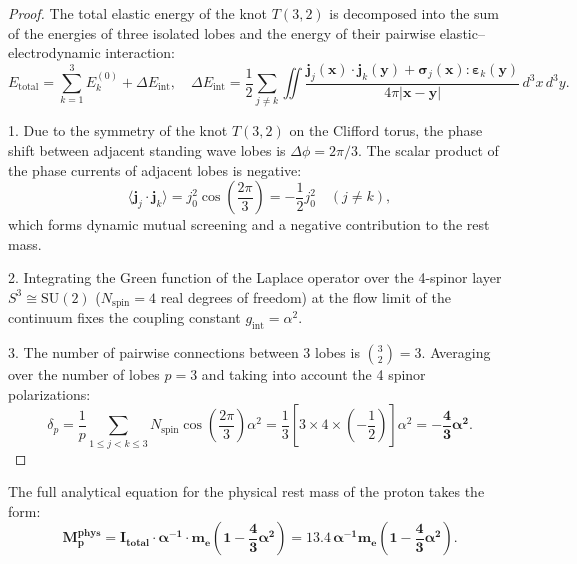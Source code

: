 \documentclass[12pt,a4paper]{article}
\begin{document}
	\begin{proof}
	The total elastic energy of the knot $T(3,2)$ is decomposed into the sum of the energies of three isolated lobes and the energy of their pairwise elastic--electrodynamic interaction:
	\begin{equation}
	E_{\text{total}} = \sum_{k=1}^3 E_k^{(0)} + \Delta E_{\text{int}}, \quad \Delta E_{\text{int}} = \frac{1}{2} \sum_{j \ne k} \iint \frac{\mathbf{j}_j(\mathbf{x}) \cdot \mathbf{j}_k(\mathbf{y}) + \boldsymbol{\sigma}_j(\mathbf{x}) : \boldsymbol{\varepsilon}_k(\mathbf{y})}{4\pi |\mathbf{x} - \mathbf{y}|} \, d^3x \, d^3y.
	\end{equation}
				
	1. Due to the symmetry of the knot $T(3,2)$ on the Clifford torus, the phase shift between adjacent standing wave lobes is $\Delta \phi = 2\pi/3$. The scalar product of the phase currents of adjacent lobes is negative:
	\begin{equation}
	\langle \mathbf{j}_j \cdot \mathbf{j}_k \rangle = j_0^2 \cos\left(\frac{2\pi}{3}\right) = -\frac{1}{2} j_0^2 \quad (j \ne k),
	\end{equation}
	which forms dynamic mutual screening and a negative contribution to the rest mass.
				
	2. Integrating the Green function of the Laplace operator over the 4-spinor layer $S^3 \cong \mathrm{SU}(2)$ ($N_{\text{spin}} = 4$ real degrees of freedom) at the flow limit of the continuum fixes the coupling constant $g_{\text{int}} = \alpha^2$.
				
	3. The number of pairwise connections between 3 lobes is $\binom{3}{2} = 3$. Averaging over the number of lobes $p=3$ and taking into account the 4 spinor polarizations:
	\begin{equation}
	\delta_p = \frac{1}{p} \sum_{1 \le j < k \le 3} N_{\text{spin}} \cos\left(\frac{2\pi}{3}\right) \alpha^2 = \frac{1}{3} \left[ 3 \times 4 \times \left(-\frac{1}{2}\right) \right] \alpha^2 = \mathbf{-\frac{4}{3} \alpha^2}.
	\end{equation}
	\end{proof}
			
	The full analytical equation for the physical rest mass of the proton takes the form:
	\begin{equation}
	\mathbf{M_p^{\text{phys}} = I_{\text{total}} \cdot \alpha^{-1} \cdot m_e \left( 1 - \frac{4}{3}\alpha^2 \right) = 13.4 \, \alpha^{-1} m_e \left( 1 - \frac{4}{3}\alpha^2 \right)}.
	\end{equation}
			
\end{document}
